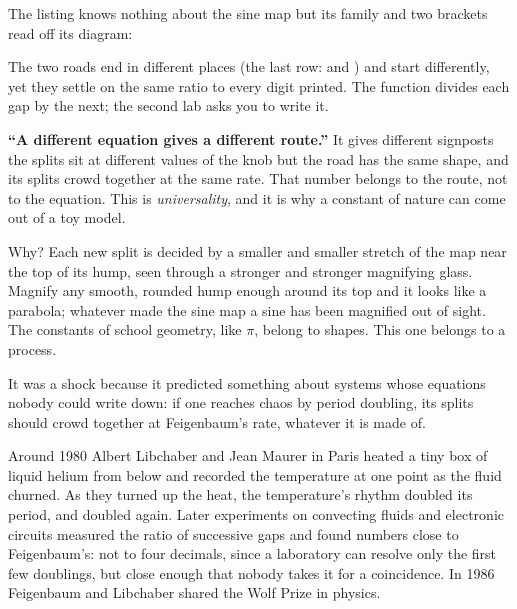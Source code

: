 \noindent
The listing knows nothing about the sine map but its family and two brackets
read off its diagram:



\noindent
The two roads end in different places (the last row:  and
) and start differently, yet they settle on the same ratio
to every digit printed. The function  divides each gap by the
next; the second lab asks you to write it.

\begin{trapbox}
\textbf{\enquote{A different equation gives a different route.}} It gives
different signposts \dash{} the splits sit at different values of the knob
\dash{} but the road has the same shape, and its splits crowd together at the
same rate. That number belongs to the route, not to the equation. This is
\emph{universality}, and it is why a constant of nature can come out of a
toy model.
\end{trapbox}

\noindent
Why? Each new split is decided by a smaller and smaller stretch of the map
near the top of its hump, seen through a stronger and stronger magnifying
glass. Magnify any smooth, rounded hump enough around its top and it looks
like a parabola; whatever made the sine map a sine has been magnified out of
sight. The constants of school geometry, like $\pi$, belong to shapes. This
one belongs to a process.


\noindent
It was a shock because it predicted something about systems whose equations
nobody could write down: if one reaches chaos by period doubling, its splits
should crowd together at Feigenbaum's rate, whatever it is made of.

\begin{worldbox}
Around 1980 Albert Libchaber and Jean Maurer in Paris heated a tiny box of
liquid helium from below and recorded the temperature at one point as the
fluid churned. As they turned up the heat, the temperature's rhythm doubled
its period, and doubled again. Later experiments on convecting fluids and
electronic circuits measured the ratio of successive gaps and found numbers
close to Feigenbaum's: not to four decimals, since a laboratory can resolve
only the first few doublings, but close enough that nobody takes it for a
coincidence. In 1986 Feigenbaum and Libchaber shared the Wolf Prize in
physics.
\end{worldbox}

